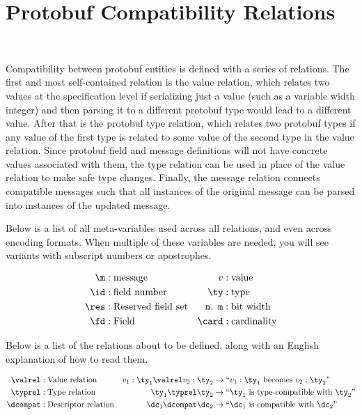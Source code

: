 \section{Protobuf Compatibility Relations}~\label{sec:proto-relations}

Compatibility between protobuf entities is defined with a series of
relations. The first and most self-contained relation is the value relation,
which relates two values at the specification level if serializing just a value
(such as a variable width integer) and then parsing it to a different protobuf
type would lead to a different value. After that is the protobuf type relation,
which relates two protobuf types if any value of the first type is related to
some value of the second type in the value relation. Since protobuf field and
message definitions will not have concrete values associated with them, the type
relation can be used in place of the value relation to make safe type
changes. Finally, the message relation connects compatible messages such that
all instances of the original message can be parsed into instances of the updated
message.

Below is a list of all meta-variables used across all relations, and even across
encoding formats. When multiple of these variables are needed, you will see
variants with subscript numbers or apostrophes.

\begin{align*}
  \m &: \text{message} & v &: \text{value} \\
  \id &: \text{field number} & \ty &: \text{type} \\
  \res &: \text{Reserved field set} & \mathtt{n},\ \mathtt{m} &: \text{bit width} \\
  \fd &: \text{Field} & \card &: \text{cardinality}
\end{align*}

Below is a list of the relations about to be defined, along with an English
explanation of how to read them.

\begin{align*}
  \valrel &: \text{Value relation} & v_1 : \ty_1 \valrel v_2 : \ty_2 &\rightarrow \text{``}v_1 : \ty_1 \text{ becomes } v_2 :
                                           \ty_2 \text{''} \\
  \typrel &: \text{Type relation} & \ty_1 \typrel \ty_2 &\rightarrow \text{``}\ty_1\text{ is type-compatible with }
                                          \ty_2\text{''} \\
  \dcompat &: \text{Descriptor relation} & \dc_1 \dcompat \dc_2 &\rightarrow \text{``}\dc_1 \text{ is compatible with } \dc_2\text{''}
\end{align*}


